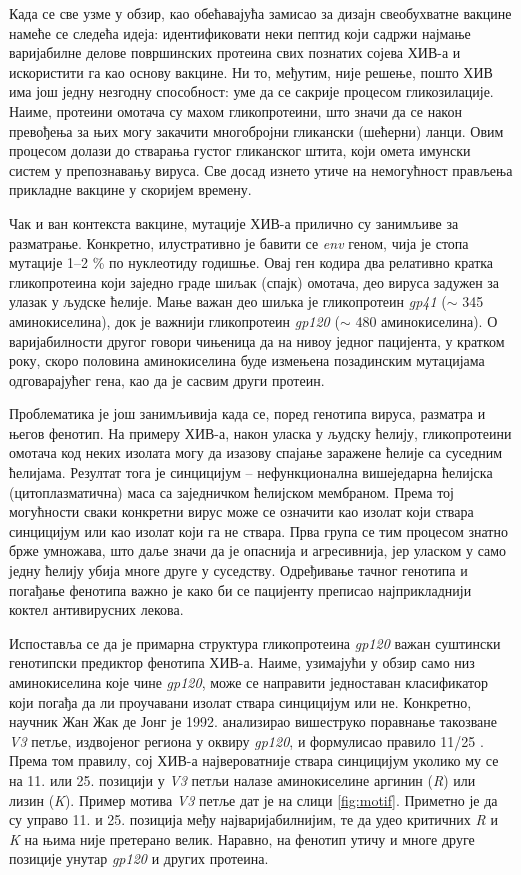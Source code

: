 \documentclass[12pt,oneside]{memoir}
\begin{document}
\begin{CJK}{UTF8}{ipxm}
Када се све узме у обзир, као обећавајућа замисао за дизајн свеобухватне вакцине намеће се следећа идеја: идентификовати неки пептид који садржи најмање варијабилне делове површинских протеина свих познатих сојева ХИВ-а и искористити га као основу вакцине. Ни то, међутим, није решење, пошто ХИВ има још једну незгодну способност: уме да се сакрије процесом гликозилације. Наиме, протеини омотача су махом гликопротеини, што значи да се након превођења за њих могу закачити многобројни гликански (шећерни) ланци. Овим процесом долази до стварања густог гликанског штита, који омета имунски систем у препознавању вируса. Све досад изнето утиче на немогућност прављења прикладне вакцине у скоријем времену.

Чак и ван контекста вакцине, мутације ХИВ-а прилично су занимљиве за разматрање. Конкретно, илустративно је бавити се \textit{env} геном, чија је стопа мутације 1--2 \% по нуклеотиду годишње. Овај ген кодира два релативно кратка гликопротеина који заједно граде шиљак (спајк) омотача, део вируса задужен за улазак у људске ћелије. Мање важан део шиљка је гликопротеин \textit{gp41} ($\sim$ 345 аминокиселина), док је важнији гликопротеин \textit{gp120} ($\sim$ 480 аминокиселина). О варијабилности другог говори чињеница да на нивоу једног пацијента, у кратком року, скоро половина аминокиселина буде измењена позадинским мутацијама одговарајућег гена, као да је сасвим други протеин.

Проблематика је још занимљивија када се, поред генотипа вируса, разматра и његов фенотип. На примеру ХИВ-а, након уласка у људску ћелију, гликопротеини омотача код неких изолата могу да изазову спајање заражене ћелије са суседним ћелијама. Резултат тога је синцицијум -- нефункционална вишеједарна ћелијска (цитоплазматична) маса са заједничком ћелијском мембраном. Према тој могућности сваки конкретни вирус може се означити као изолат који ствара синцицијум или као изолат који га не ствара. Прва група се тим процесом знатно брже умножава, што даље значи да је опаснија и агресивнија, јер уласком у само једну ћелију убија многе друге у суседству. Одређивање тачног генотипа и погађање фенотипа важно је како би се пацијенту преписао најприкладнији коктел антивирусних лекова.

Испоставља се да је примарна структура гликопротеина \textit{gp120} важан суштински генотипски предиктор фенотипа ХИВ-а. Наиме, узимајући у обзир само низ аминокиселина које чине \textit{gp120}, може се направити једноставан класификатор који погађа да ли проучавани изолат ствара синцицијум или не. Конкретно, научник Жан Жак де Јонг је 1992. анализирао вишеструко поравнање такозване \textit{V3} петље, издвојеног региона у оквиру \textit{gp120}, и формулисао правило 11/25 \cite{jong1992}. Према том правилу, сој ХИВ-а највероватније ствара синцицијум уколико му се на 11. или 25. позицији у \textit{V3} петљи налазе аминокиселине аргинин (\textit{R}) или лизин (\textit{K}). Пример мотива \textit{V3} петље дат је на слици \ref{fig:motif}. Приметно је да су управо 11. и 25. позиција међу најваријабилнијим, те да удео критичних \textit{R} и \textit{K} на њима није претерано велик. Наравно, на фенотип утичу и многе друге позиције унутар \textit{gp120} и других протеина.


\end{CJK}
\end{document}
